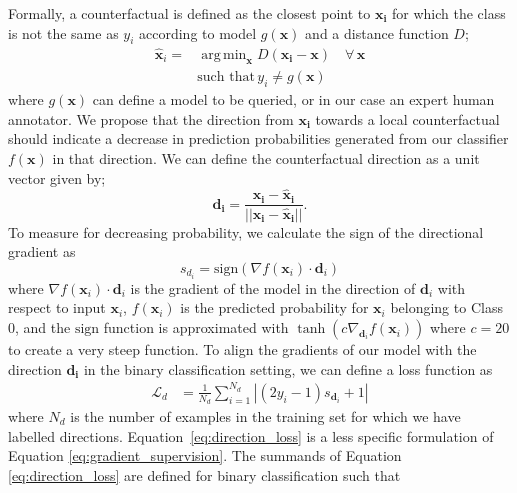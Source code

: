 \documentclass[sigconf,anonymous]{aamas}
\DeclareMathOperator*{\argmin}{arg\,min}
\begin{document}
Formally, a counterfactual is defined as the closest point to $\mathbf{x_i}$ for which the class is not the same as $y_i$ according to model $g(\mathbf{x})$ and a distance function $D$;
\begin{equation}\label{eq:counterfactual}
\begin{aligned}
    \hat{\mathbf{x}}_i =& \argmin_{\mathbf{x}} D(\mathbf{x_i}-\mathbf{x}) \,\,\,\,\,\, \forall \, \mathbf{x} \\ &\text{such that} \, y_i \neq g(\mathbf{x})
\end{aligned}
\end{equation}
where $g(\mathbf{x})$ can define a model to be queried, or in our case an expert human annotator. We propose that the direction from $\mathbf{x_i}$ towards a local counterfactual should indicate a decrease in prediction probabilities generated from our classifier $f(\mathbf{x})$ in that direction. We can define the counterfactual direction as a unit vector given by; 
\begin{equation}
    \mathbf{d_i}=\frac{\mathbf{x_i}-\mathbf{\hat{x}_i}}{||\mathbf{x_i}-\mathbf{\hat{x}_i}||}. \label{eq:dir_unit}
\end{equation}
To measure for decreasing probability, we calculate the sign of the directional gradient as
\begin{equation}
    s_{d_i} = \textrm{sign}(\nabla f(\mathbf{x}_i) \cdot \mathbf{d}_{i} )
\end{equation}
where $\nabla f(\mathbf{x}_i) \cdot \mathbf{d}_{i}$ is the gradient of the model in the direction of $\mathbf{d}_i$ with respect to input $\mathbf{x}_i$, $f(\mathbf{x}_i)$ is the predicted probability for $\mathbf{x}_i$ belonging to Class 0, and the $\textrm{sign}$ function is approximated with $\tanh{(c \nabla_{\mathbf{d}_{i}} f(\mathbf{x}_i) )}$ where $c=20$ to create a very steep function. To align the gradients of our model with the direction $\mathbf{d_i}$ in the binary classification setting, we can define a loss function as 
\begin{align}\label{eq:direction_loss}
    \mathcal{L}_{d} &= \frac{1}{N_d} \sum^{N_d}_{i=1} |(2y_i - 1)s_{\mathbf{d}_i} + 1|
\end{align}
where $N_d$ is the number of examples in the training set for which we have labelled directions. Equation~\ref{eq:direction_loss} is a less specific formulation of Equation \ref{eq:gradient_supervision}. The summands of Equation \ref{eq:direction_loss} are defined for binary classification such that
\end{document}
